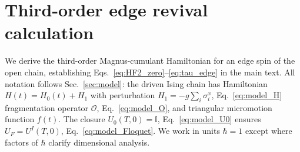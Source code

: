 \documentclass[aps,prb,reprint,twocolumn,amsmath,amssymb,citeautoscript]{revtex4-2}
\begin{document}

\section{Third-order edge revival calculation}
\label{app:edge_pt}

We derive the third-order Magnus-cumulant Hamiltonian for an edge
spin of the open chain, establishing
Eqs.~\eqref{eq:HF2_zero}--\eqref{eq:tau_edge} in the main text.
All notation follows Sec.~\ref{sec:model}: the driven Ising chain has
Hamiltonian $H(t)=H_0(t)+H_1$ with perturbation
$H_1=-g\sum_i\sigma_i^x$, Eq.~\eqref{eq:model_H} fragmentation operator
$\mathcal{O}$, Eq.~\eqref{eq:model_O}, and triangular micromotion
function $f(t)$.
The closure $U_0(T,0)=\mathbb{I}$, Eq.~\eqref{eq:model_U0} ensures
$U_F=U^I(T,0)$, Eq.~\eqref{eq:model_Floquet}.
We work in units $\hbar=1$ except where factors of $\hbar$ clarify
dimensional analysis.
\end{document}
